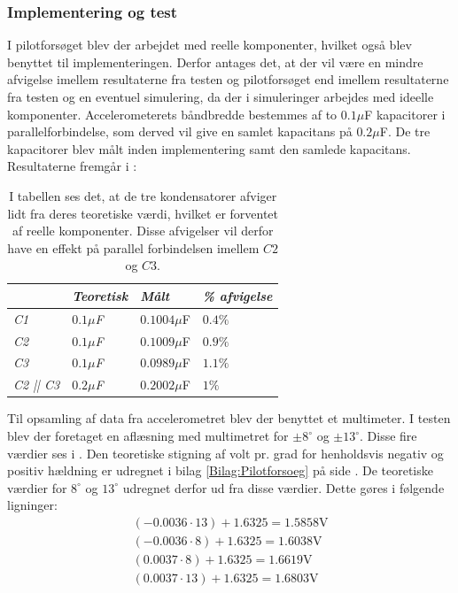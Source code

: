 \subsubsection{Implementering og test}
I pilotforsøget blev der arbejdet med reelle komponenter, hvilket også blev benyttet til implementeringen. Derfor antages det, at der vil være en mindre afvigelse imellem resultaterne fra testen og pilotforsøget end imellem resultaterne fra testen og en eventuel simulering, da der i simuleringer arbejdes med ideelle komponenter. Accelerometerets båndbredde bestemmes af to $0.1\mu$F kapacitorer i parallelforbindelse, som derved vil give en samlet kapacitans på  $0.2\mu$F. De tre kapacitorer blev målt inden implementering samt den samlede kapacitans. Resultaterne fremgår i  :
\begin{table}[H]
	\centering
	\begin{tabular}{|l|l|l|l|}\hline
		& \textit{Teoretisk} & \textit{Målt} & \textit{\% afvigelse} \\ \hline
		\textit{C1}       & \textit{$0.1\mu$F} & $0.1004\mu$F  & $0.4\%$               \\ \hline		
		\textit{C2}       & \textit{$0.1\mu$F} & $0.1009\mu$F  & $0.9\%$               \\ \hline
		\textit{C3}       & \textit{$0.1\mu$F} & $0.0989\mu$F  & $1.1\%$               \\ \hline
		\textit{C2 || C3} & \textit{$0.2\mu$F} & $0.2002\mu$F  & $1\%$                \\ \hline
	\end{tabular}
	\caption{I tabellen ses det, at de tre kondensatorer afviger lidt fra deres teoretiske værdi, hvilket er forventet af reelle komponenter. Disse afvigelser vil derfor have en effekt på parallel forbindelsen imellem $C2$ og $C3$.}
	\label{Tab:Acc_kondensator}
\end{table}
\noindent Til opsamling af data fra accelerometret blev der benyttet et multimeter. I testen blev der foretaget en aflæsning med multimetret for $\pm8^\circ$ og $\pm13^\circ$. Disse fire værdier ses i . Den teoretiske stigning af volt pr. grad for henholdsvis negativ og positiv hældning er udregnet i bilag \ref{Bilag:Pilotforsoeg} på side \pageref{Bilag:Pilotforsoeg}. De teoretiske værdier for $8^\circ$ og $13^\circ$ udregnet derfor ud fra disse værdier. Dette gøres i følgende ligninger:
\begin{align}
(-0.0036 \cdot 13) + 1.6325 = 1.5858\text{V} \\
(-0.0036 \cdot 8) + 1.6325 = 1.6038\text{V}  \\
(0.0037 \cdot 8) + 1.6325 = 1.6619\text{V}  \\
(0.0037 \cdot 13) + 1.6325 = 1.6803\text{V}
\end{align}
